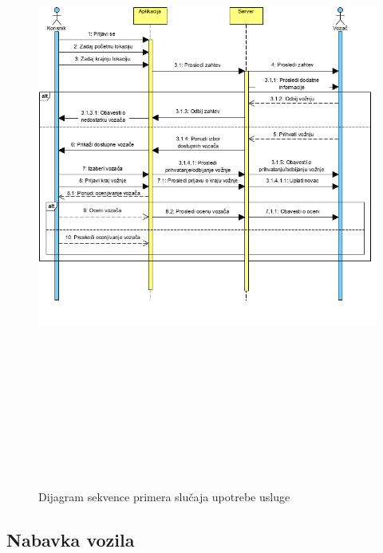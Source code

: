 \newpage

\begin{figure}[H]
\begin{center}
\includegraphics[width=490pt, height = 600pt]{Slike/VoznjaSekvenca.png}
\end{center}
    \caption{Dijagram sekvence primera slučaja upotrebe usluge}
\label{fig:VožnjaSekvenca}
\end{figure}

\subsection{\bfseries Nabavka vozila}

